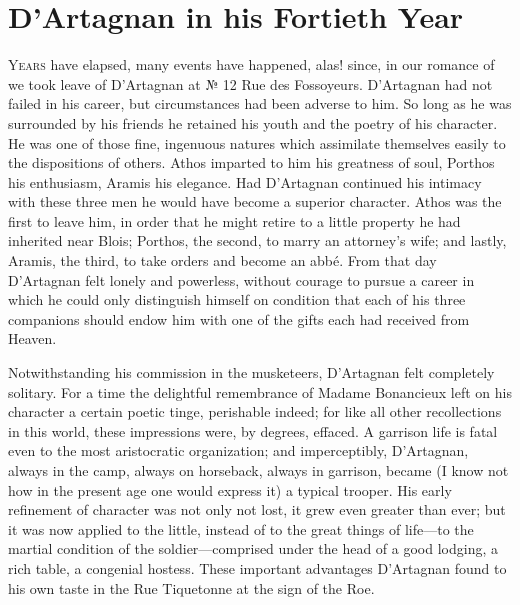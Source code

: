 \chapter{D'Artagnan in his Fortieth Year}

 \lettrine{Y}{ears} have elapsed, many events have happened, alas! since, in our romance of  we took leave of D'Artagnan at № 12 Rue des Fossoyeurs. D'Artagnan had not failed in his career, but circumstances had been adverse to him. So long as he was surrounded by his friends he retained his youth and the poetry of his character. He was one of those fine, ingenuous natures which assimilate themselves easily to the dispositions of others. Athos imparted to him his greatness of soul, Porthos his enthusiasm, Aramis his elegance. Had D'Artagnan continued his intimacy with these three men he would have become a superior character. Athos was the first to leave him, in order that he might retire to a little property he had inherited near Blois; Porthos, the second, to marry an attorney's wife; and lastly, Aramis, the third, to take orders and become an abbé. From that day D'Artagnan felt lonely and powerless, without courage to pursue a career in which he could only distinguish himself on condition that each of his three companions should endow him with one of the gifts each had received from Heaven.

Notwithstanding his commission in the musketeers, D'Artagnan felt completely solitary. For a time the delightful remembrance of Madame Bonancieux left on his character a certain poetic tinge, perishable indeed; for like all other recollections in this world, these impressions were, by degrees, effaced. A garrison life is fatal even to the most aristocratic organization; and imperceptibly, D'Artagnan, always in the camp, always on horseback, always in garrison, became (I know not how in the present age one would express it) a typical trooper. His early refinement of character was not only not lost, it grew even greater than ever; but it was now applied to the little, instead of to the great things of life—to the martial condition of the soldier—comprised under the head of a good lodging, a rich table, a congenial hostess. These important advantages D'Artagnan found to his own taste in the Rue Tiquetonne at the sign of the Roe.

